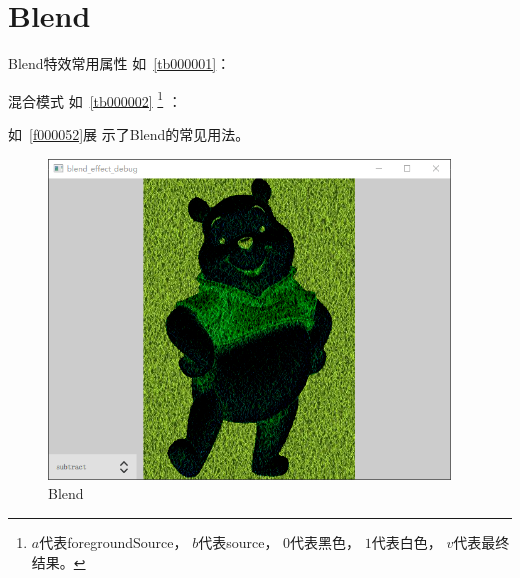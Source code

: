﻿




\FloatBarrier
\section{
Blend
}\label{c000015s000002}


Blend特效常用属性
如\tablename\ \ref{tb000001}：



混合模式
如\tablename\ \ref{tb000002}
    \footnote{$a$代表foregroundSource，
$b$代表source，
$0$代表黑色，
$1$代表白色，
$v$代表最终结果。}
：



如\filesourcenumbernameone\ \ref{f000052}展
示了Blend的常见用法。

\begin{figure}[htb] %
\marginnote{\setlength\fboxsep{2pt}\fbox{\footnotesize{\kaishu\figurename\,}\footnotesize{\ref{p000018}}}}\centering %
\includegraphics[width=0.95\textwidth]{../chapter06/blend_effect/the_app.png} %
\caption{Blend} %
\label{p000018} %
\end{figure}


